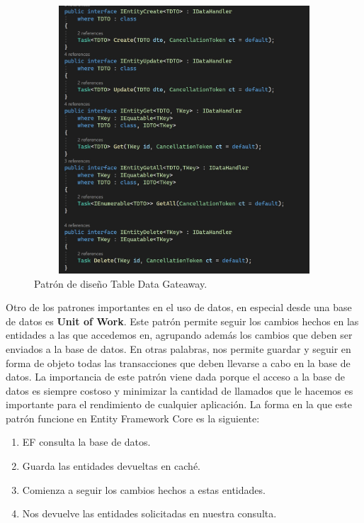 \begin{figure}[H]
	\centering
	\includegraphics[width = 12cm, height=10cm]{Graphics/table_data_gateaway_pattern.jpg}
	\caption{Patrón de diseño Table Data Gateaway.}
	\label{fig:tableDataGateaway}
\end{figure}

Otro de los patrones importantes en el uso de datos, en especial desde una base de datos es \textbf{Unit of Work}. Este patrón permite seguir los cambios hechos en las entidades a las que accedemos en, agrupando además los cambios que deben ser enviados a la base de datos. En otras palabras, nos permite guardar y seguir en forma de objeto todas las transacciones que deben llevarse a cabo en la base de datos. La importancia de este patrón viene dada porque el acceso a la base de datos es siempre costoso y minimizar la cantidad de llamados que le hacemos es importante para el rendimiento de cualquier aplicación. La forma en la que este patrón funcione en Entity Framework Core es la siguiente:

\begin{enumerate}
	\item EF consulta la base de datos.
    \item Guarda las entidades devueltas en caché.
    \item Comienza a seguir los cambios hechos a estas entidades.
    \item Nos devuelve las entidades solicitadas en nuestra consulta.
    
\end{enumerate}


